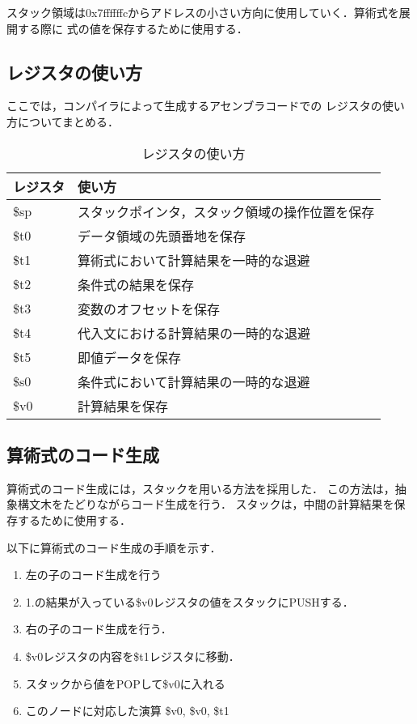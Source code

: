 \documentclass[11pt]{jarticle}
\begin{document}
スタック領域は0x7ffffffcからアドレスの小さい方向に使用していく．算術式を展開する際に
式の値を保存するために使用する．

\subsection{レジスタの使い方}

ここでは，コンパイラによって生成するアセンブラコードでの
レジスタの使い方についてまとめる．

\begin{table}[h] \label{table:register} \caption{レジスタの使い方}
    \begin{center}
        \begin{tabular}{l|l}
            レジスタ & 使い方 \\ \hline
            \$sp & スタックポインタ，スタック領域の操作位置を保存 \\
            \$t0 & データ領域の先頭番地を保存 \\
            \$t1 & 算術式において計算結果を一時的な退避 \\
            \$t2 & 条件式の結果を保存 \\
            \$t3 & 変数のオフセットを保存 \\
            \$t4 & 代入文における計算結果の一時的な退避 \\
            \$t5 & 即値データを保存 \\
            \$s0 & 条件式において計算結果の一時的な退避 \\
            \$v0 & 計算結果を保存
        \end{tabular}
    \end{center}
\end{table}

\subsection{算術式のコード生成}

算術式のコード生成には，スタックを用いる方法を採用した．
この方法は，抽象構文木をたどりながらコード生成を行う．
スタックは，中間の計算結果を保存するために使用する．

以下に算術式のコード生成の手順を示す．

\begin{enumerate}
    \item 左の子のコード生成を行う
    \item 1.の結果が入っている\$v0レジスタの値をスタックにPUSHする．
    \item 右の子のコード生成を行う．
    \item \$v0レジスタの内容を\$t1レジスタに移動．
    \item スタックから値をPOPして\$v0に入れる
    \item このノードに対応した演算 \$v0, \$v0, \$t1
\end{enumerate}
\end{document}
